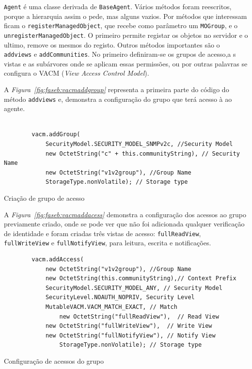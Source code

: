 \texttt{Agent} é uma classe derivada de \texttt{BaseAgent}. Vários métodos foram
reescritos, porque a hierarquia assim o pede, mas alguns vazios. Por métodos que
interessam ficam o \texttt{registerManagedObject}, que recebe como parâmetro um
\texttt{MOGroup}, e o \texttt{unregisterManagedObject}. O primeiro permite
registar os objetos no servidor e o ultimo, remove os mesmos do registo. Outros
métodos importantes são o \texttt{addviews} e \texttt{addCommunities}. No
primeiro definiram-se os grupos de acesso,a s vistas e as subárvores onde se
aplicam essas permissões, ou por outras palavras se configura o VACM (\emph{View
Access Control Model}).

A \emph{Figura~\ref{fig:faseb:vacmaddgroup}} representa a primeira parte do
código do método \texttt{addviews} e, demonstra a configuração do grupo que terá
acesso à ao agente.
\begin{center}
 	 	\begin{verbatim}

		vacm.addGroup(
			SecurityModel.SECURITY_MODEL_SNMPv2c, //Security Model
			new OctetString("c" + this.communityString), // Security Name
			new OctetString("v1v2group"), //Group Name
			StorageType.nonVolatile); // Storage type
\end{verbatim}
 	\captionsetup{type=figure, width=0.8\linewidth}
	\caption{Criação de grupo de acesso}
\label{fig:faseb:vacmaddgroup} 
\end{center}

A  \emph{Figura~\ref{fig:faseb:vacmaddacess}}  demonstra a configuração dos
acessos ao grupo previamente criado, onde se pode ver que não foi adicionada
qualquer verificação de identidade e foram criadas três vistas de acesso:
\texttt{fullReadView}, \texttt{fullWriteView} e \texttt{fullNotifyView}, para
leitura, escrita e notificações.
\begin{center}
 	 	\begin{verbatim}
		vacm.addAccess(
			new OctetString("v1v2group"), //Group Name
			new OctetString(this.communityString),// Context Prefix
			SecurityModel.SECURITY_MODEL_ANY, // Security Model
			SecurityLevel.NOAUTH_NOPRIV, Security Level
			MutableVACM.VACM_MATCH_EXACT, // Match
				new OctetString("fullReadView"),  // Read View
			new OctetString("fullWriteView"),  // Write View
			new OctetString("fullNotifyView"), // Notify View
				StorageType.nonVolatile); // Storage type
\end{verbatim}
 	\captionsetup{type=figure, width=0.8\linewidth}
	\caption{Configuração de acessos do grupo}
\label{fig:faseb:vacmgroupacess} 
\end{center}

